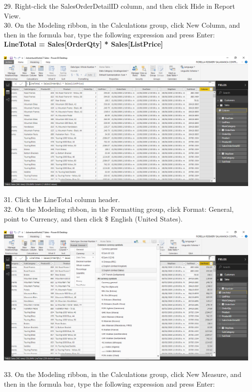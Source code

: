 29. Right-click the SalesOrderDetailID column, and then click Hide in Report View.\\
30. On the Modeling ribbon, in the Calculations group, click New Column, and then in the formula bar, type the following expression and press Enter:\\

\textbf{LineTotal = Sales[OrderQty] * Sales[ListPrice]}

	\begin{center}
	\includegraphics[width=17cm]{./Imagenes/Ejercicio1/Tarea3/26}
	\end{center}	

31. Click the LineTotal column header.\\
32. On the Modeling ribbon, in the Formatting group, click Format: General, point to Currency, and then click \$ English (United States).\\

	\begin{center}
	\includegraphics[width=17cm]{./Imagenes/Ejercicio1/Tarea3/27}
	\end{center}	

33. On the Modeling ribbon, in the Calculations group, click New Measure, and then in the formula bar, type the following expression and press Enter:\\

